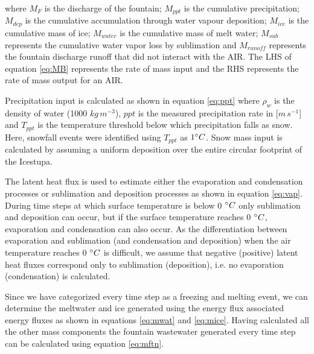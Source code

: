 \documentclass[utf8]{frontiersSCNS} %
\begin{document}
where $M_{F}$ is the discharge of the fountain; $M_{ppt}$ is the cumulative precipitation;  $M_{dep}$ is the cumulative
accumulation through water vapour deposition; $M_{ice}$ is the cumulative mass of ice; $M_{water}$ is the cumulative
mass of melt water; $M_{sub}$ represents the cumulative water vapor loss by sublimation and $M_{runoff}$ represents the
fountain discharge runoff that did not interact with the AIR. The LHS of equation \ref{eq:MB} represents the rate of
mass input and the RHS represents the rate of mass output for an AIR. 

Precipitation input is calculated as shown in equation \ref{eq:ppt} where $\rho_{w}$ is the density of water (1000
$kg\,m^{-3}$), $ppt$ is the measured precipitation rate in [$m\,s^{-1}$] and $T_{ppt}$ is the temperature threshold
below which precipitation falls as snow. Here, snowfall events were identified using $T_{ppt}$ as $1 \degree C$. Snow
mass input is calculated by assuming a uniform deposition over the entire circular footprint of the Icestupa. 

The latent heat flux is used to estimate either the evaporation and condensation processes or sublimation and deposition
processes as shown in equation \ref{eq:vap}. During time steps at which surface temperature is below 0 $\degree C$ only
sublimation and deposition can occur, but if the surface temperature reaches 0 $\degree C$, evaporation and condensation
can also occur. As the differentiation between evaporation and sublimation (and condensation and deposition) when the
air temperature reaches 0 $\degree C$ is difficult, we assume that negative (positive) latent heat fluxes correspond
only to sublimation (deposition), i.e. no evaporation (condensation) is calculated.

Since we have categorized every time step as a freezing and melting event, we can determine the meltwater and  ice
generated using the energy flux associated energy fluxes as shown in equations \ref{eq:mwat} and \ref{eq:mice}. Having
calculated all the other mass components the fountain wastewater generated every time step can be calculated using
equation \ref{eq:mftn}.
\end{document}
